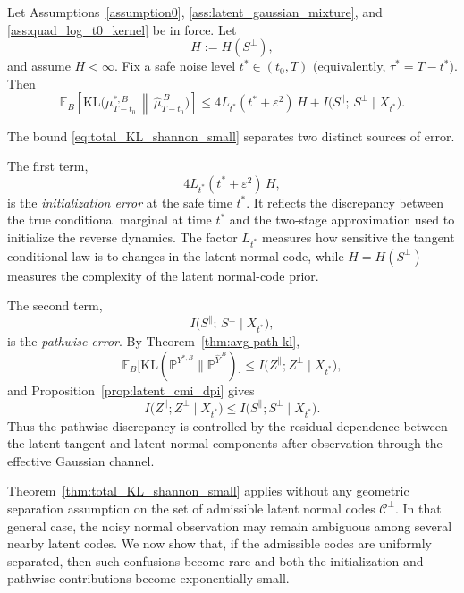 \documentclass[twoside,11pt]{article}
\newcommand{\E}{\mathbb{E}}
\newcommand{\PP}{\mathbb{P}}
\newcommand{\Cc}{\mathcal{C}}
\newcommand{\KL}{\mathrm{KL}}
\numberwithin{equation}{section}
\begin{document}
\begin{theorem}
\label{thm:total_KL_shannon_small}
Let Assumptions~\ref{assumption0}, \ref{ass:latent_gaussian_mixture}, and
\ref{ass:quad_log_t0_kernel} be in force. Let
\[
H := H(S^\perp),
\]
and assume \(H<\infty\). Fix a safe noise level \(t^*\in(t_0,T)\)
(equivalently, \(\tau^*=T-t^*\)). Then
\begin{equation}
\label{eq:total_KL_shannon_small}
\E_B\!\left[\KL\!\big(\mu_{T-t_0}^{*,B}\,\middle\|\,\hat\mu_{T-t_0}^{\,B}\big)\right]
\le
4L_{t^*}(t^*+\varepsilon^2)\,H
+
I\!\big(S^\parallel;\,S^\perp \mid X_{t^*}\big).
\end{equation}
\end{theorem}

\begin{remark}
The bound \eqref{eq:total_KL_shannon_small} separates two distinct sources of error.

The first term,
\[
4L_{t^*}(t^*+\varepsilon^2)\,H,
\]
is the \emph{initialization error} at the safe time \(t^*\). It reflects the discrepancy
between the true conditional marginal at time \(t^*\) and the two-stage approximation used
to initialize the reverse dynamics. The factor \(L_{t^*}\) measures how sensitive the tangent
conditional law is to changes in the latent normal code, while \(H=H(S^\perp)\) measures the
complexity of the latent normal-code prior.

The second term,
\[
I\!\big(S^\parallel;\,S^\perp \mid X_{t^*}\big),
\]
is the \emph{pathwise error}. By Theorem~\ref{thm:avg-path-kl},
\[
\E_B\!\big[\KL(\PP^{Y^{*,B}}\|\PP^{\hat Y^{\,B}})\big]
\le
I\!\big(Z^\parallel;Z^\perp\mid X_{t^*}\big),
\]
and Proposition~\ref{prop:latent_cmi_dpi} gives
\[
I\!\big(Z^\parallel;Z^\perp\mid X_{t^*}\big)
\le
I\!\big(S^\parallel;S^\perp\mid X_{t^*}\big).
\]
Thus the pathwise discrepancy is controlled by the residual dependence between the latent
tangent and latent normal components after observation through the effective Gaussian channel.
\end{remark}


Theorem~\ref{thm:total_KL_shannon_small} applies without any geometric separation assumption
on the set of admissible latent normal codes \(\Cc^\perp\). In that general case, the noisy
normal observation may remain ambiguous among several nearby latent codes. We now show that,
if the admissible codes are uniformly separated, then such confusions become rare and both
the initialization and pathwise contributions become exponentially small.
\end{document}
